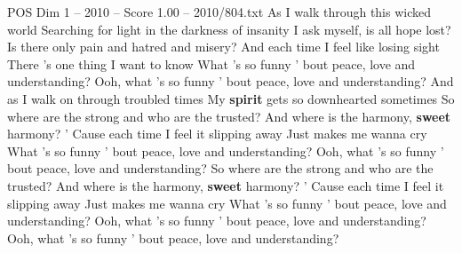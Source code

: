 \begin{textsample}{POS Dim 1 – 2010 – Score 1.00 – 2010/804.txt}  \label{ex:f1_pos_028}
As I walk through this wicked world Searching for light in the darkness of insanity I ask myself, is all hope lost?
Is there only pain and hatred and misery?
And each time I feel like losing sight There 's one thing I want to know What 's so funny ' bout peace, love and understanding?
Ooh, what 's so funny ' bout peace, love and understanding?
And as I walk on through troubled times My \textbf{spirit} gets so downhearted sometimes So where are the strong and who are the trusted?
And where is the harmony, \textbf{sweet} harmony? ' Cause each time I feel it slipping away Just makes me wanna cry What 's so funny ' bout peace, love and understanding?
Ooh, what 's so funny ' bout peace, love and understanding?
So where are the strong and who are the trusted?
And where is the harmony, \textbf{sweet} harmony? ' Cause each time I feel it slipping away Just makes me wanna cry What 's so funny ' bout peace, love and understanding?
Ooh, what 's so funny ' bout peace, love and understanding?
Ooh, what 's so funny ' bout peace, love and understanding?

\end{textsample}
